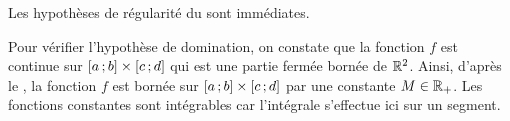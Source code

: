 
\begin{solution}
\begin{reponses}
\item Les hypothèses de régularité du  sont immédiates.
    
Pour vérifier l'hypothèse de domination, on constate que la fonction $f$ est continue sur $\left[a\,;b\right] \times \left[c\,;d\right]$ qui est une partie fermée bornée de $\mathbb{R}^2$. Ainsi, d'après le , la fonction $f$ est bornée sur $\left[a\,;b\right] \times \left[c\,;d\right]$ par une constante $M \in \mathbb{R}_+$. Les fonctions constantes sont intégrables car l'intégrale s'effectue ici sur un segment.
        

\end{reponses}
\end{solution}
